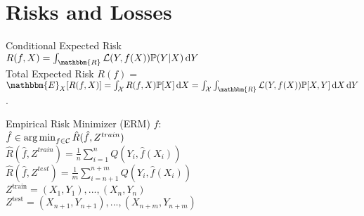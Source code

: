 \section*{Risks and Losses}
Conditional Expected Risk\\
$R(f, X) = \int_{\mathbbm{R}} \mathcal{L}(Y,f(X))\mathbb{P}(Y|X)\di Y$\\
Total Expected Risk
$R(f) =$\\
$\mathbbm{E}_{X}[R(f,X)] =\int_{\mathcal{X}}R(f,X)\mathbb{P}[X]\di X =
\int_{\mathcal{X}}\int_{\mathbbm{R}} \mathcal{L}(Y,f(X))\mathbb{P}[X,Y]\di X\di Y$.


Empirical Risk Minimizer (ERM) $\hat{f}$:\\
$\hat{f} \in \operatorname*{arg\,min}_{f \in \mathcal{C}} \hat{R}(\hat{f}, Z^{train})$\\
$\hat{R}(\hat{f}, Z^{train}) = \frac{1}{n} \sum_{i=1}^n Q(Y_i, \hat{f}(X_i))$\\
$\hat{R}(\hat{f}, Z^{test}) = \frac{1}{m} \sum_{i=n+1}^{n+m} Q(Y_i, \hat{f}(X_i))$\\
$Z^\text{train}={(X_1,Y_1),...,(X_n,Y_n)}$ \\
$Z^\text{test}={(X_{n+1},Y_{n+1}),...,(X_{n+m},Y_{n+m})}$

